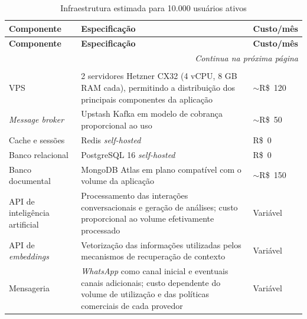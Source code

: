 {\small
\begin{longtable}{|p{3.5cm}|p{7.0cm}|p{3.0cm}|}
\caption{Infraestrutura estimada para 10.000 usuários ativos}
\label{quad:infra_prod} \\

\hline
\textbf{Componente} & \textbf{Especificação} & \textbf{Custo/mês} \\ \hline
\endfirsthead

\hline
\textbf{Componente} & \textbf{Especificação} & \textbf{Custo/mês} \\ \hline
\endhead

\hline
\multicolumn{3}{r}{\fontsize{10pt}{10pt}\selectfont\textit{Continua na próxima página}} \\
\endfoot

\hline
\multicolumn{3}{c}{\fontsize{10pt}{10pt}\selectfont \textbf{Fonte:} Elaborado pelos autores (2026).} \\
\endlastfoot

VPS &
2 servidores Hetzner CX32 (4 vCPU, 8 GB RAM cada), permitindo a distribuição dos principais componentes da aplicação &
$\sim$R\$~120 \\ \hline

\textit{Message broker} &
Upstash Kafka em modelo de cobrança proporcional ao uso &
$\sim$R\$~50 \\ \hline

Cache e sessões &
Redis \textit{self-hosted} &
R\$~0 \\ \hline

Banco relacional &
PostgreSQL 16 \textit{self-hosted} &
R\$~0 \\ \hline

Banco documental &
MongoDB Atlas em plano compatível com o volume da aplicação &
$\sim$R\$~150 \\ \hline

API de inteligência artificial &
Processamento das interações conversacionais e geração de análises; custo proporcional ao volume efetivamente processado &
Variável \\ \hline

API de \textit{embeddings} &
Vetorização das informações utilizadas pelos mecanismos de recuperação de contexto &
Variável \\ \hline

Mensageria &
\textit{WhatsApp} como canal inicial e eventuais canais adicionais; custo dependente do volume de utilização e das políticas comerciais de cada provedor &
Variável \\ \hline


\end{longtable}}
